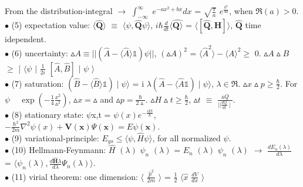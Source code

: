 \documentclass[10pt,fancy]{elegantbook}
\begin{document}
{From the distribution-integral $\rightarrow$ $\int_{-\infty}^{\infty}$ $e^{-ax^2 + bx} dx$ = $\sqrt{ \frac{\pi}{a}}$ $e^{\frac{b^2}{4a}}$, when $\Re{(a)} > 0$.  \\

$\bullet$ (5) expectation value: $\langle\hat{\mathbf Q} \rangle$ $\equiv$ $\langle\psi, \hat{\mathbf Q}\psi \rangle$, $i \hbar \frac{d}{dt} \langle \hat{\mathbf Q \rangle}$ = $\langle[ \hat{\mathbf Q},{\mathbf H}] \rangle$, $\hat{\mathbf Q}$ time idependent.  \\

$\bullet$ (6) uncertainty: $\vartriangle{A} \equiv || (\hat{A} - \langle \hat{A} \rangle \mathbb{1}) \psi ||$,  
$(\vartriangle{A})^2$ = $\langle \hat{A}^2 \rangle - \langle \hat{A} \rangle^2 \geq$ 0.  
$\vartriangle{A} \vartriangle{B}$ $\geq$ | $\langle \psi$ $\mid$ $\frac{1}{2i}$ $[\hat{A},\hat{B}]$ $\mid$ $\psi$ $\rangle$  \\

$\bullet$ (7) saturation: $(\hat{B} - \langle \hat{B} \rangle \mathbb1) \mid \psi \rangle$ = i $\lambda (\hat{A} - \langle \hat{A} \mathbb1)\mid \psi \rangle$, $\lambda \in \Re$.  
$\vartriangle{x} \vartriangle{p} \geq \frac{\hbar}{2}$. For $\psi$ ~ $\exp(- \frac{1}{4} \frac{x^2}{\vartriangle^2})$,  
$\vartriangle{x} = \vartriangle$ and $\vartriangle{p} = \frac{\hbar}{2 \vartriangle}$.  
$\vartriangle{H} \vartriangle{t} \geq \frac{\hbar}{2}$, $\vartriangle{t}$ $\equiv$ $\frac{\vartriangle Q } { |\mid \frac{d Q}{dt} \mid}$.  \\

$\bullet$ (8) stationary state: $\psi${x,t} = $\psi (x)e^{- \frac{iEt}{\hbar}}$, $- \frac{\hbar^2}{2m} \nabla^2 \psi(x) + \mathbf V(\mathbf x) \Psi(\mathbf x) = E \psi(\mathbf x)$.   \\

$\bullet$ (9) variational-principle: $E_{gs} \leq \langle \psi, \hat{H} \psi \rangle$, for all normalized $\psi$. \\

$\bullet$ (10) Hellmann-Feynmann: $\hat{H}$ $(\lambda)$ $\psi_n$ $(\lambda)$ = $E_n$ $(\lambda)$ $\psi_n$ $(\lambda)$ $\longrightarrow$ $\frac{dE_n (\lambda) } {d \lambda} $ = $\langle \psi_n (\lambda), \frac{d \hat{\mathbf H}{\lambda}} {d \lambda} \Psi_n(\lambda) \rangle$.  \\

$\bullet$ (11) virial theorem: one dimension: $\langle$ $\frac{\hat{p}^2}{2m} $  $\rangle $ = $\frac{1}{2}$ $\langle \hat{x}$  $\frac{dV}{dx}$ $\rangle$  \\

}
\end{document}
